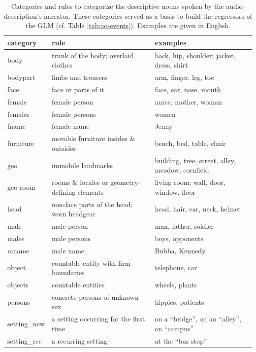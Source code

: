 \documentclass[english]{article}
\begin{document}
\begin{table}[h!]
    \caption{Categories and rules to categorize the descriptive nouns spoken by
        the audio-description's narrator. These categories served as a basis to
        build the regressors of the GLM (cf. Table \ref{tab:ao-events}).
        Examples are given in English.
}
\label{tab:descr-nouns-rules}
\begin{tabular}{lll}
\toprule
\textbf{category} & \textbf{rule} & \textbf{examples} \\
\midrule
body & trunk of the body; overlaid clothes & back, hip, shoulder; jacket, dress, shirt
\tabularnewline
bodypart & limbs and trousers & arm, finger, leg, toe
\tabularnewline
face & face or parts of it & face, ear, nose, mouth
\tabularnewline
female & female person & nurse, mother, woman
\tabularnewline
females & female persons & women
\tabularnewline
fname & female name & Jenny
\tabularnewline
furniture & movable furniture insides \& outsides & bench, bed, table, chair
\tabularnewline
geo & immobile landmarks & building, tree, street, alley, meadow, cornfield \tabularnewline
geo-room & rooms \& locales or geometry-defining elements & living room; wall, door, window, floor
\tabularnewline
head & non-face parts of the head; worn headgear & head, hair, ear, neck,
helmet
\tabularnewline
male & male person & man, father, soldier
\tabularnewline
males & male persons & boys, opponents
\tabularnewline
mname & male name & Bubba, Kennedy
\tabularnewline
object & countable entity with firm boundaries & telephone, car
\tabularnewline
objects & countable entities & wheels, plants
\tabularnewline
persons & concrete persons of unknown sex & hippies, patients
\tabularnewline
setting\_new & a setting occurring for the first time & on a ``bridge'', on an ``alley'', on ``campus''
\tabularnewline
setting\_rec & a recurring setting & at the ``bus stop'' \tabularnewline
\bottomrule
\end{tabular}
\end{table}


\end{document}
